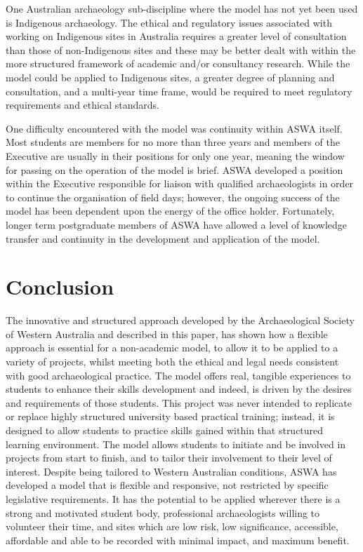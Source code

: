 \documentclass{ijsra}
\begin{document}
One Australian archaeology sub-discipline where the model has not yet been used is Indigenous archaeology. The ethical and regulatory issues associated with working on Indigenous sites in Australia requires a greater level of consultation than those of non-Indigenous sites and these may be better dealt with within the more structured framework of academic and/or consultancy research. 
While the model could be applied to Indigenous sites, a greater degree of planning and consultation, and a multi-year time frame, would be required to meet regulatory requirements and ethical standards.

One difficulty encountered with the model was continuity within ASWA itself. Most students are members for no more than three years and members of the Executive are usually in their positions for only one year, meaning the window for passing on the operation of the model is brief. 
ASWA developed a position within the Executive responsible for liaison with qualified archaeologists in order to continue the organisation of field days; however, the ongoing success of the model has been dependent upon the energy of the office holder. 
Fortunately, longer term postgraduate members of ASWA have allowed a level of knowledge transfer and continuity in the development and application of the model.

\section{Conclusion}

The innovative and structured approach developed by the Archaeological Society of Western Australia and described in this paper, has shown how a flexible approach is essential for a non-academic model, to allow it to be applied to a variety of projects, whilst meeting both the ethical and legal needs consistent with good archaeological practice. 
The model offers real, tangible experiences to students to enhance their skills development and indeed, is driven by the desires and requirements of those students. This project was never intended to replicate or replace highly structured university based practical training; instead, it is designed to allow students to practice skills gained within that structured learning environment. 
The model allows students to initiate and be involved in projects from start to finish, and to tailor their involvement to their level of interest. Despite being tailored to Western Australian conditions, ASWA has developed a model that is flexible and responsive, not restricted by specific legislative requirements. 
It has the potential to be applied wherever there is a strong and motivated student body, professional archaeologists willing to volunteer their time, and sites which are low risk, low significance, accessible, affordable and able to be recorded with minimal impact, and maximum benefit. 
\end{document}
